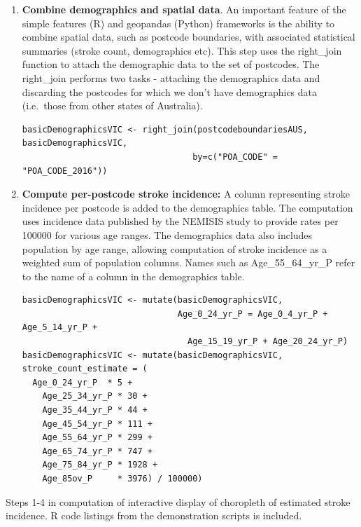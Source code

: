 \documentclass[utf8]{frontiersHLTH}
\begin{document}
\begin{table}[h]
\begin{center}
\begin{mdframed}[backgroundcolor=blue!20]
\begin{enumerate}
\begin{lstlisting}
\end{lstlisting}
\item
  {\bf Combine demographics and spatial data}. An important feature of the
  simple features (R) and geopandas (Python) frameworks is the ability to combine
  spatial data, such as postcode boundaries, with associated statistical
  summaries (stroke count, demographics etc). This step uses the
  right\_join function to attach the demographic data to the set of
  postcodes. The right\_join performs two tasks - attaching the
  demographics data and discarding the postcodes for which we don't have
  demographics data (i.e.~those from other states of Australia).
\begin{lstlisting}
basicDemographicsVIC <- right_join(postcodeboundariesAUS, basicDemographicsVIC, 
                                  by=c("POA_CODE" = "POA_CODE_2016"))
\end{lstlisting}
\item
  {\bf Compute per-postcode stroke incidence:} A column representing stroke
  incidence per postcode is added to the demographics table. The
  computation uses incidence data published by the NEMISIS\cite{thrift_stroke_2000}
  study to provide rates per 100000 for various age ranges. The
  demographics data also includes population by age range, allowing
  computation of stroke incidence as a weighted sum of population
  columns. Names such as Age\_55\_64\_yr\_P refer to the name of a
  column in the demographics table.
\begin{lstlisting}
basicDemographicsVIC <- mutate(basicDemographicsVIC, 
                               Age_0_24_yr_P = Age_0_4_yr_P + Age_5_14_yr_P + 
                                 Age_15_19_yr_P + Age_20_24_yr_P)
basicDemographicsVIC <- mutate(basicDemographicsVIC, stroke_count_estimate = ( 
  Age_0_24_yr_P  * 5 +  
    Age_25_34_yr_P * 30 +   
    Age_35_44_yr_P * 44 +  
    Age_45_54_yr_P * 111 +  
    Age_55_64_yr_P * 299 +  
    Age_65_74_yr_P * 747 + 
    Age_75_84_yr_P * 1928 +  
    Age_85ov_P     * 3976) / 100000)
\end{lstlisting}
\end{enumerate}
\end{mdframed}
\end{center}
\caption{Steps 1-4 in computation of interactive display of choropleth of
  estimated stroke incidence. R code listings from the demonstration scripts
is included. \label{tab:exampleA1}}
\end{table}
\end{document}
